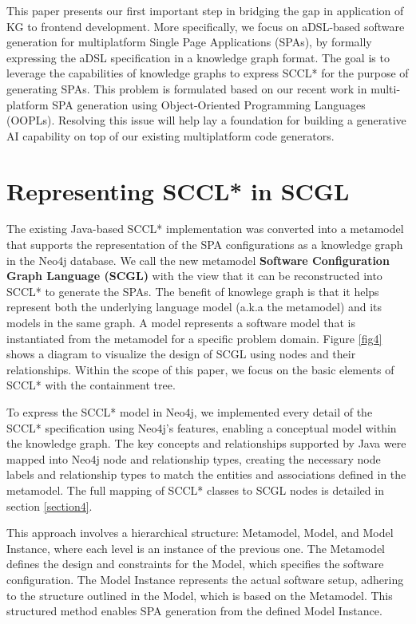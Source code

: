 \documentclass[runningheads]{llncs}
\begin{document}
This paper presents our first important step in bridging the gap in application of KG to frontend development. More specifically,  we focus on aDSL-based software generation for multiplatform Single Page Applications (SPAs), by formally expressing the aDSL specification in a knowledge graph format. The goal is to leverage the capabilities of knowledge graphs to express SCCL* for the purpose of generating SPAs. This problem is formulated based on our recent work in multi-platform SPA generation using Object-Oriented Programming Languages (OOPLs). Resolving this issue will help lay a foundation for building a generative AI capability on top of our existing multiplatform code generators.

\section{Representing SCCL* in SCGL} \label{section3}
\vspace{-0.2cm}
The existing Java-based SCCL* implementation was converted into a metamodel that supports the representation of the SPA configurations as a knowledge graph in the Neo4j database. We call the new metamodel \textbf{Software Configuration Graph Language (SCGL)} with the view that it can be reconstructed into SCCL* to generate the SPAs. The benefit of knowlege graph is that it helps represent both the underlying language model (a.k.a the metamodel) and its models in the same graph. A model represents a software model that is instantiated from the metamodel for a specific problem domain. Figure \ref{fig4} shows a diagram to visualize the design of SCGL using nodes and their relationships. Within the scope of this paper, we focus on the basic elements of SCCL* with the containment tree. 

To express the SCCL* model in Neo4j, we implemented every detail of the SCCL* specification using Neo4j’s features, enabling a conceptual model within the knowledge graph. The key concepts and relationships supported by Java were mapped into Neo4j node and relationship types, creating the necessary node labels and relationship types to match the entities and associations defined in the metamodel. The full mapping of SCCL* classes to SCGL nodes is detailed in section \ref{section4}.

This approach involves a hierarchical structure: Metamodel, Model, and Model Instance, where each level is an instance of the previous one. The Metamodel defines the design and constraints for the Model, which specifies the software configuration. The Model Instance represents the actual software setup, adhering to the structure outlined in the Model, which is based on the Metamodel. This structured method enables SPA generation from the defined Model Instance.
\end{document}
